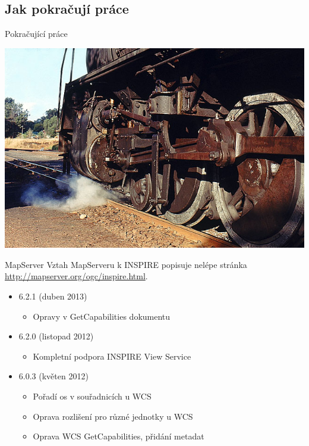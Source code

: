 \documentclass{beamer}
\begin{document}
\subsection{Jak pokračují práce}
\begin{frame}{Pokračující práce}
    \begin{center} 
        \includegraphics[width=\textwidth]{imgs/ils/engine.jpg}
    \end{center}
\end{frame}


\begin{frame}{MapServer}
Vztah MapServeru k INSPIRE popisuje nelépe stránka
\url{http://mapserver.org/ogc/inspire.html}. 

\begin{itemize}
    \item 6.2.1 (duben 2013)
        \begin{itemize}
            \item Opravy v GetCapabilities dokumentu
        \end{itemize}
        \pause
    \item 6.2.0 (listopad 2012)
        \begin{itemize}
            \item Kompletní podpora INSPIRE View Service
        \end{itemize}
        \pause
    \item 6.0.3 (květen 2012)
        \begin{itemize}
            \item Pořadí os v souřadnicích u WCS
            \item Oprava rozlišení pro různé jednotky u WCS
            \item Oprava WCS GetCapabilities, přidání metadat
        \end{itemize}
\end{itemize}
\end{frame}
\end{document}
